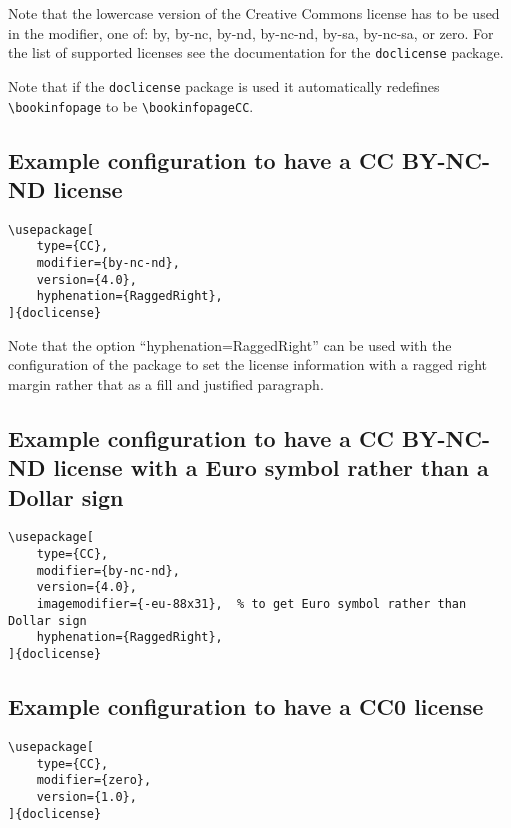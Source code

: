 \documentclass[examplethesis.tex]{subfiles}
\begin{document}
Note that the lowercase version of the Creative Commons license has to be used in the modifier, \ie one of: by, by-nc, by-nd, by-nc-nd, by-sa, by-nc-sa, or zero. For the list of supported licenses see the documentation for the \texttt{doclicense} package.

Note that if the \texttt{doclicense} package is used it automatically redefines \texttt{\textbackslash bookinfopage} to be \texttt{\textbackslash bookinfopageCC}.

\subsection{Example configuration to have a CC BY-NC-ND license}

\begin{lstlisting}[style=latexExampleForAuthors]
\usepackage[
    type={CC},
    modifier={by-nc-nd},
    version={4.0},
    hyphenation={RaggedRight},
]{doclicense}
\end{lstlisting}

Note that the option ``hyphenation={RaggedRight}'' can be used with the configuration of the package to set the license information with a ragged right margin rather that as a fill and justified paragraph.


\subsection{Example configuration to have a CC BY-NC-ND license with a Euro symbol rather than a Dollar sign}

\begin{lstlisting}[style=latexExampleForAuthors]
\usepackage[
    type={CC},
    modifier={by-nc-nd},
    version={4.0},
    imagemodifier={-eu-88x31},  % to get Euro symbol rather than Dollar sign
    hyphenation={RaggedRight},
]{doclicense}
\end{lstlisting}


\subsection{Example configuration to have a CC0 license}

\begin{lstlisting}[style=latexExampleForAuthors]
\usepackage[
    type={CC},
    modifier={zero},
    version={1.0},
]{doclicense}
\end{lstlisting}
\end{document}
